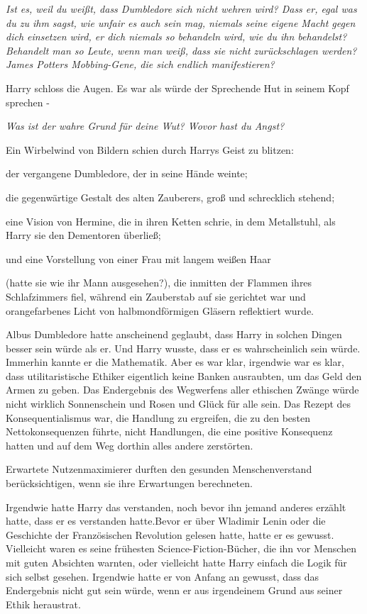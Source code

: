 {\emph{Ist es, weil du weißt, dass Dumbledore sich nicht wehren wird? Dass er, egal was du zu ihm sagst, wie unfair es auch sein mag, niemals seine eigene Macht gegen dich einsetzen wird, er dich niemals so behandeln wird, wie du ihn behandelst? Behandelt man so Leute, wenn man weiß, dass sie nicht zurückschlagen werden? James Potters Mobbing-Gene, die sich endlich manifestieren?}

Harry schloss die Augen. Es war als würde der Sprechende Hut in seinem Kopf sprechen -

\emph{Was ist der wahre Grund für deine Wut? Wovor hast du Angst?}

Ein Wirbelwind von Bildern schien durch Harrys Geist zu blitzen:

der vergangene Dumbledore, der in seine Hände weinte;

die gegenwärtige Gestalt des alten Zauberers, groß und schrecklich stehend;

eine Vision von Hermine, die in ihren Ketten schrie, in dem Metallstuhl, als Harry sie den Dementoren überließ;

und eine Vorstellung von einer Frau mit langem weißen Haar

(hatte sie wie ihr Mann ausgesehen?), die inmitten der Flammen ihres Schlafzimmers fiel, während ein Zauberstab auf sie gerichtet war und orangefarbenes Licht von halbmondförmigen Gläsern reflektiert wurde.

Albus Dumbledore hatte anscheinend geglaubt, dass Harry in solchen Dingen besser sein würde als er. Und Harry wusste, dass er es wahrscheinlich sein würde. Immerhin kannte er die Mathematik. Aber es war klar, irgendwie war es klar, dass utilitaristische Ethiker eigentlich keine Banken ausraubten, um das Geld den Armen zu geben. Das Endergebnis des Wegwerfens aller ethischen Zwänge würde nicht wirklich Sonnenschein und Rosen und Glück für alle sein. Das Rezept des Konsequentialismus war, die Handlung zu ergreifen, die zu den besten Nettokonsequenzen führte, nicht Handlungen, die eine positive Konsequenz hatten und auf dem Weg dorthin alles andere zerstörten.

Erwartete Nutzenmaximierer durften den gesunden Menschenverstand berücksichtigen, wenn sie ihre Erwartungen berechneten.

Irgendwie hatte Harry das verstanden, noch bevor ihn jemand anderes erzählt hatte, dass er es verstanden hatte.Bevor er über Wladimir Lenin oder die Geschichte der Französischen Revolution gelesen hatte, hatte er es gewusst. Vielleicht waren es seine frühesten Science-Fiction-Bücher, die ihn vor Menschen mit guten Absichten warnten, oder vielleicht hatte Harry einfach die Logik für sich selbst gesehen. Irgendwie hatte er von Anfang an gewusst, dass das Endergebnis nicht gut sein würde, wenn er aus irgendeinem Grund aus seiner Ethik heraustrat.

}
